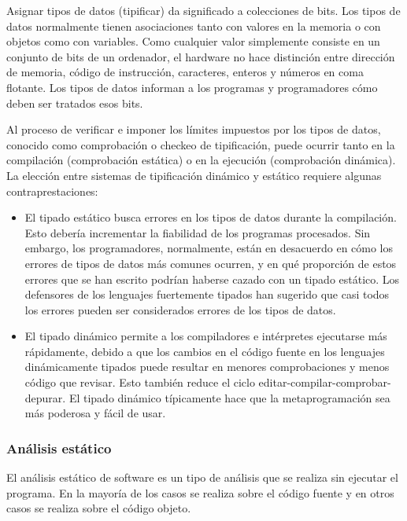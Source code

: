 Asignar tipos de datos (tipificar) da significado a colecciones de bits. Los tipos de datos normalmente tienen asociaciones tanto con valores en la memoria o con objetos como con variables. Como cualquier valor simplemente consiste en un conjunto de bits de un ordenador, el hardware no hace distinci\'on entre direcci\'on de memoria, c\'odigo de instrucci\'on, caracteres, enteros y n\'umeros en coma flotante. Los tipos de datos informan a los programas y programadores c\'omo deben ser tratados esos bits.

Al proceso de verificar e imponer los l\'imites impuestos por los tipos de datos, conocido como comprobaci\'on o checkeo de tipificaci\'on, puede ocurrir tanto en la compilaci\'on (comprobaci\'on est\'atica) o en la ejecuci\'on (comprobaci\'on din\'amica). La elecci\'on entre sistemas de tipificaci\'on din\'amico y est\'atico requiere algunas contraprestaciones:

\begin{itemize}
\item El tipado est\'atico busca errores en los tipos de datos durante la compilaci\'on. Esto deber\'ia incrementar la fiabilidad de los programas procesados. Sin embargo, los programadores, normalmente, est\'an en desacuerdo en c\'omo los errores de tipos de datos m\'as comunes ocurren, y en qu\'e proporci\'on de estos errores que se han escrito podr\'ian haberse cazado con un tipado est\'atico.  Los defensores de los lenguajes fuertemente tipados han sugerido que casi todos los errores pueden ser considerados errores de los tipos de datos.
\item El tipado din\'amico permite a los compiladores e int\'erpretes ejecutarse m\'as r\'apidamente, debido a que los cambios en el c\'odigo fuente en los lenguajes din\'amicamente tipados puede resultar en menores comprobaciones y menos c\'odigo que revisar. Esto tambi\'en reduce el ciclo editar-compilar-comprobar-depurar. El tipado din\'amico t\'ipicamente hace que la metaprogramaci\'on sea m\'as poderosa y f\'acil de usar.
\end{itemize}


\subsubsection*{An\'alisis est\'atico}
\label{ap2:sec:analis}

El an\'alisis est\'atico de software es un tipo de an\'alisis que se realiza sin ejecutar el programa. En la mayor\'ia de los casos se realiza sobre el c\'odigo fuente y en otros casos se realiza sobre el c\'odigo objeto.

